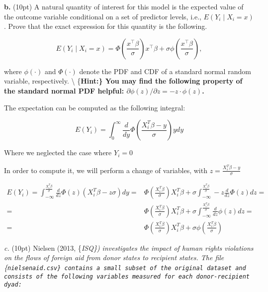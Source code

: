 \documentclass{article}
\begin{document}
    \textbf{b.} (10pt) A natural quantity of interest for this model is the
expected value of the outcome variable conditional on a set of predictor
levels, i.e., \(E(Y_i \mid X_i=x)\). Prove that the exact expression for
this quantity is the following.

\begin{equation*}
    E(Y_i \mid X_i=x) =  \Phi\left(\frac{x^\top \beta}{\sigma}\right)x^\top\beta + \sigma \phi\left(\frac{x^\top \beta}{\sigma}\right),
  \end{equation*}

where \(\phi(\cdot)\) and \(\Phi(\cdot)\) denote the PDF and CDF of a
standard normal random variable, respectively. \textbackslash{}
\{\bf Hint:\} You may find the following property of the standard normal
PDF helpful: \(\partial\phi(z)/\partial z = -z\cdot \phi(z)\).

    The expectation can be computed as the following integral:

\[
E(Y_i) =\int_{0}^\infty  \frac{d}{dy} \Phi\left (\frac{X_i^T\beta-y}{\sigma}\right ) y dy 
\]

Where we neglected the case where \(Y_i=0\)

In order to compute it, we will perform a change of variables, with
\(z = \frac{X_i^T\beta-y}{\sigma}\)

\begin{align*}
E(Y_i)=
\int_{-\infty}^{\frac{X_i^T\beta}{\sigma}}
      \frac{d}{dz} \Phi\left (z\right ) (X_i^T\beta - z\sigma)dy = &
%
%
\Phi\left(\frac{X_i^T\beta}{\sigma}\right)X_i^T\beta 
+ \sigma \int_{-\infty}^{\frac{X_i^T\beta}{\sigma}} -z \frac{d}{dz} \Phi(z) dz = \\ = &
\Phi\left(\frac{X_i^T\beta}{\sigma}\right)X_i^T\beta 
+ \sigma \int_{-\infty}^{\frac{X_i^T\beta}{\sigma}} \frac{d}{dz} \phi(z) dz = \\ = &
\Phi\left(\frac{X_i^T\beta}{\sigma}\right)X_i^T\beta 
+\sigma \phi\left(\frac{X_i^T\beta}{\sigma}\right)
\end{align*}

    \emph{c.} (10pt) Nielsen (2013, \{\it ISQ\}) investigates the impact of
human rights violations on the flows of foreign aid from donor states to
recipient states. The file \{\tt nielsenaid.csv\} contains a small
subset of the original dataset and consists of the following variables
measured for each donor-recipient dyad:
\end{document}
